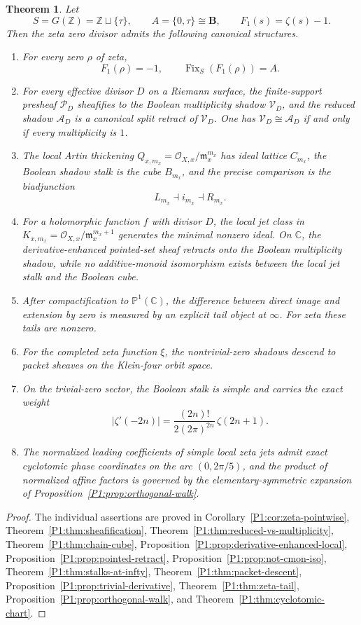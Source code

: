 \documentclass[11pt,a4paper]{article}
\numberwithin{equation}{section}
\newtheorem{theorem}{Theorem}[section]
\theoremstyle{definition}
\theoremstyle{remark}
\DeclareMathOperator{\Fix}{Fix}
\newcommand{\ZZ}{\mathbb Z}
\newcommand{\CC}{\mathbb C}
\newcommand{\PP}{\mathbb P}
\newcommand{\BB}{\mathbf B}
\newcommand{\cO}{\mathcal O}
\newcommand{\cP}{\mathcal P}
\newcommand{\cV}{\mathcal V}
\newcommand{\cA}{\mathcal A}
\newcommand{\taup}{\tau}
\begin{document}
\begin{theorem}
Let
\[
S=G(\ZZ)=\ZZ\sqcup\{\taup\},\qquad A=\{0,\taup\}\cong\BB,
\qquad F_1(s)=\zeta(s)-1.
\]
Then the zeta zero divisor admits the following canonical structures.
\begin{enumerate}[label=(\roman*)]
\item For every zero $\rho$ of zeta,
\[
F_1(\rho)=-1,
\qquad
\Fix_S(F_1(\rho))=A.
\]
\item For every effective divisor $D$ on a Riemann surface, the finite-support presheaf $\cP_D$ sheafifies to the Boolean multiplicity shadow $\cV_D$, and the reduced shadow $\cA_D$ is a canonical split retract of $\cV_D$.  One has $\cV_D\cong\cA_D$ if and only if every multiplicity is $1$.
\item The local Artin thickening $Q_{x,m_x}=\cO_{X,x}/\mathfrak m_x^{m_x}$ has ideal lattice $C_{m_x}$, the Boolean shadow stalk is the cube $B_{m_x}$, and the precise comparison is the biadjunction
\[
L_{m_x}\dashv i_{m_x}\dashv R_{m_x}.
\]
\item For a holomorphic function $f$ with divisor $D$, the local jet class in $K_{x,m_x}=\cO_{X,x}/\mathfrak m_x^{m_x+1}$ generates the minimal nonzero ideal.  On $\CC$, the derivative-enhanced pointed-set sheaf retracts onto the Boolean multiplicity shadow, while no additive-monoid isomorphism exists between the local jet stalk and the Boolean cube.
\item After compactification to $\PP^1(\CC)$, the difference between direct image and extension by zero is measured by an explicit tail object at $\infty$.  For zeta these tails are nonzero.
\item For the completed zeta function $\xi$, the nontrivial-zero shadows descend to packet sheaves on the Klein-four orbit space.
\item On the trivial-zero sector, the Boolean stalk is simple and carries the exact weight
\[
|\zeta'(-2n)|=\frac{(2n)!}{2(2\pi)^{2n}}\,\zeta(2n+1).
\]
\item The normalized leading coefficients of simple local zeta jets admit exact cyclotomic phase coordinates on the arc $(0,2\pi/5)$, and the product of normalized affine factors is governed by the elementary-symmetric expansion of Proposition~\ref{P1:prop:orthogonal-walk}.
\end{enumerate}
\end{theorem}

\begin{proof}
The individual assertions are proved in Corollary~\ref{P1:cor:zeta-pointwise}, Theorem~\ref{P1:thm:sheafification}, Theorem~\ref{P1:thm:reduced-vs-multiplicity}, Theorem~\ref{P1:thm:chain-cube}, Proposition~\ref{P1:prop:derivative-enhanced-local}, Proposition~\ref{P1:prop:pointed-retract}, Proposition~\ref{P1:prop:not-cmon-iso}, Theorem~\ref{P1:thm:stalks-at-infty}, Theorem~\ref{P1:thm:packet-descent}, Proposition~\ref{P1:prop:trivial-derivative}, Theorem~\ref{P1:thm:zeta-tail}, Proposition~\ref{P1:prop:orthogonal-walk}, and Theorem~\ref{P1:thm:cyclotomic-chart}.
\end{proof}
\end{document}
